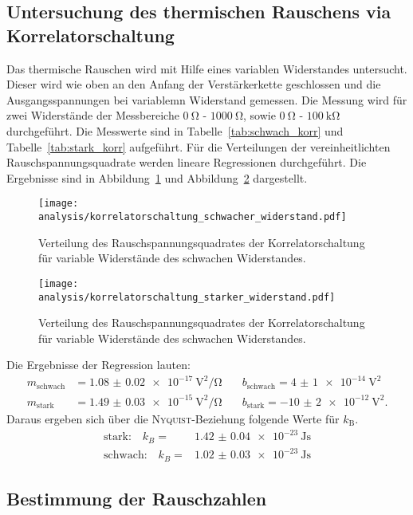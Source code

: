 \subsection{Untersuchung des thermischen Rauschens via Korrelatorschaltung}
%
Das thermische Rauschen wird mit Hilfe eines variablen Widerstandes untersucht. Dieser wird wie oben an den Anfang der Verstärkerkette geschlossen und die Ausgangsspannungen bei variablemn Widerstand gemessen. Die Messung wird für zwei Widerstände der Messbereiche $\SI{0}{\ohm}$ - $\SI{1000}{\ohm}$, sowie $\SI{0}{\ohm}$ - $\SI{100}{\kilo\ohm}$ durchgeführt. Die Messwerte sind in Tabelle~\ref{tab:schwach_korr} und Tabelle~\ref{tab:stark_korr} aufgeführt.
Für die Verteilungen der vereinheitlichten Rauschspannungsquadrate werden lineare Regressionen durchgeführt. Die Ergebnisse sind in Abbildung~\ref{fig:korr_schwach} und Abbildung~\ref{fig:korr_stark} dargestellt.
%
\begin{figure}
  \centering
  \texttt{[image: analysis/korrelatorschaltung\_schwacher\_widerstand.pdf]}
  \caption{Verteilung des Rauschspannungsquadrates der Korrelatorschaltung für variable Widerstände des schwachen Widerstandes.}
  \label{fig:korr_schwach}
\end{figure}
%
\begin{figure}
  \centering
  \texttt{[image: analysis/korrelatorschaltung\_starker\_widerstand.pdf]}
  \caption{Verteilung des Rauschspannungsquadrates der Korrelatorschaltung für variable Widerstände des schwachen Widerstandes.}
  \label{fig:korr_stark}
\end{figure}
%
Die Ergebnisse der Regression lauten:
%
\begin{align*}
  m_\text{schwach}&=\SI{1.08(2)e-17}{\volt\squared\per\ohm} \quad &b_\text{schwach}=\SI{4(1)e-14}{\volt\squared} \\ m_\text{stark}&=\SI{1.49(3)e-15}{\volt\squared\per\ohm} \quad &b_\text{stark}=\SI{-10(2)e-12}{\volt\squared}.
\end{align*}
%
Daraus ergeben sich über die \textsc{Nyquist}-Beziehung folgende Werte für $k_\text{B}$.
%
\begin{align}
  \text{stark:}\quad k_{B}=&\SI{1.42(4)e-23}{\joule\second} \\
  \text{schwach:}\quad k_{B}=&\SI{1.02(3)e-23}{\joule\second}
\end{align}
%
\subsection{Bestimmung der Rauschzahlen}

